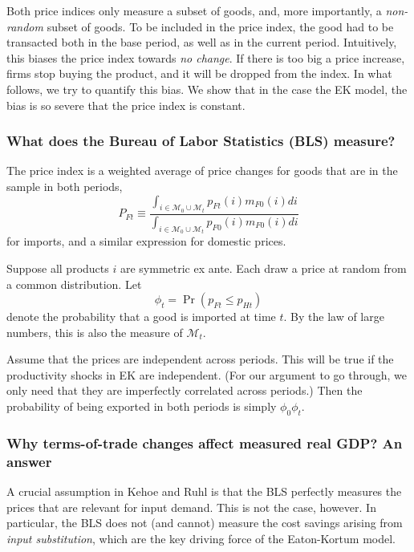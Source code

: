 \documentclass[12pt]{article}
\begin{document}
Both price indices only measure a subset of goods, and, more importantly, a 
\emph{non-random} subset of goods. To be included in the price index, the
good had to be transacted both in the base period, as well as in the current
period. Intuitively, this biases the price index towards \emph{no change}.
If there is too big a price increase, firms stop buying the product, and it
will be dropped from the index. In what follows, we try to quantify this
bias. We show that in the case the EK model, the bias is so severe that the
price index is constant.

\subsubsection{What does the Bureau of Labor Statistics (BLS) measure?}

The price index is a weighted average of price changes for goods that are in
the sample in both periods, 
\begin{equation*}
P_{Ft} \equiv \frac{\int_{i\in\mathcal{M}_0\cup\mathcal{M}%
_t}p_{Ft}(i)m_{F0}(i)di}{\int_{i\in \mathcal{M}_0\cup\mathcal{M}%
_t}p_{F0}(i)m_{F0}(i)di}
\end{equation*}
for imports, and a similar expression for domestic prices.

Suppose all products $i$ are symmetric ex ante. Each draw a price at random
from a common distribution. Let 
\begin{equation*}
\phi_{t} = \Pr(p_{Ft}\le p_{Ht})
\end{equation*}
denote the probability that a good is imported at time $t$. By the law of
large numbers, this is also the measure of $\mathcal{M}_t$.

Assume that the prices are independent across periods. This will be true if
the productivity shocks in EK are independent. (For our argument to go
through, we only need that they are imperfectly correlated across periods.)
Then the probability of being exported in both periods is simply $\phi
_{0}\phi _{t}$.

\subsubsection{Why terms-of-trade changes affect measured real GDP? An answer%
}

A crucial assumption in Kehoe and Ruhl is that the BLS perfectly measures
the prices that are relevant for input demand. This is not the case,
however. In particular, the BLS does not (and cannot) measure the cost
savings arising from \emph{input substitution}, which are the key driving
force of the Eaton-Kortum model.
\end{document}

